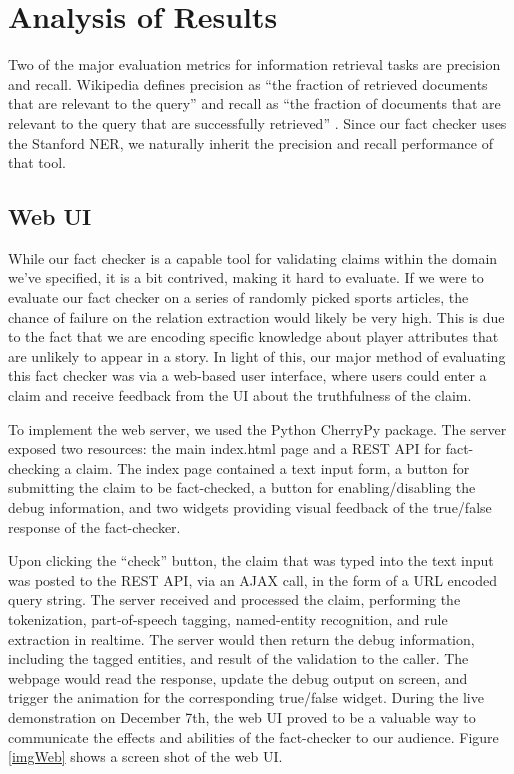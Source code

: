 \documentclass{chi2009}
\begin{document}
\section{Analysis of Results}

Two of the major evaluation metrics for information retrieval tasks are precision and recall.  Wikipedia defines precision as ``the fraction of retrieved documents that are relevant to the query'' \cite{precision} and recall as ``the fraction of documents that are relevant to the query that are successfully retrieved'' \cite{precision}.  Since our fact checker uses the Stanford NER, we naturally inherit the precision and recall performance of that tool.  

\subsection{Web UI}

While our fact checker is a capable tool for validating claims within the domain we've specified, it is a bit contrived, making it hard to evaluate.  If we were to evaluate our fact checker on a series of randomly picked sports articles, the chance of failure on the relation extraction would likely be very high.  This is due to the fact that we are encoding specific knowledge about player attributes that are unlikely to appear in a story.  In light of this, our major method of evaluating this fact checker was via a web-based user interface, where users could enter a claim and receive feedback from the UI about the truthfulness of the claim.  

To implement the web server, we used the Python CherryPy package.  The server exposed two resources: the main index.html page and a REST API for fact-checking a claim.  The index page contained a text input form, a button for submitting the claim to be fact-checked, a button for enabling/disabling the debug information, and two widgets providing visual feedback of the true/false response of the fact-checker.  

Upon clicking the ``check'' button, the claim that was typed into the text input was posted to the REST API, via an AJAX call, in the form of a URL encoded query string.  The server received and processed the claim, performing the tokenization, part-of-speech tagging, named-entity recognition, and rule extraction in realtime.  The server would then return the debug information, including the tagged entities, and result of the validation to the caller.  The webpage would read the response, update the debug output on screen, and trigger the animation for the corresponding true/false widget.  During the live demonstration on December 7th, the web UI proved to be a valuable way to communicate the effects and abilities of the fact-checker to our audience. Figure \ref{imgWeb} shows a screen shot of the web UI. 
\end{document}
